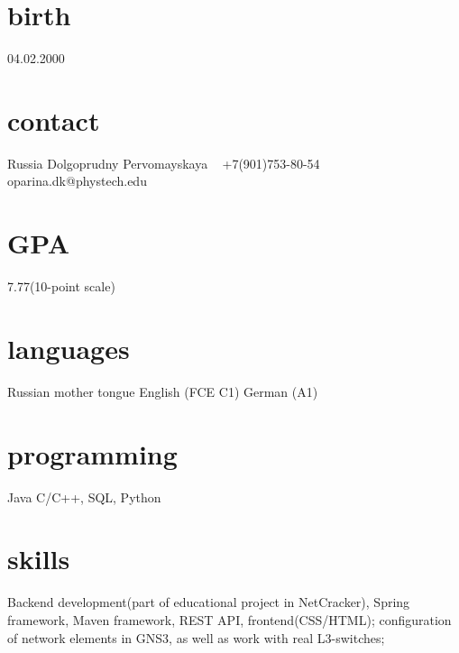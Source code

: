 \documentclass[]{cv-style}          %
\begin{document}
\lastupdated


\begin{aside}
%
\section{birth}
04.02.2000
\section{contact}
Russia
Dolgoprudny
Pervomayskaya
~
+7(901)753-80-54
~
oparina.dk@phystech.edu
%
\section{GPA}
7.77(10-point scale)
\section{languages}
Russian mother tongue
English (FCE C1)
German (A1)
%
\section{programming}
Java
C/C++, SQL, Python

%
\end{aside}


\section{skills}
  \vspace{-0.2cm}

Backend development(part of educational project in NetCracker), Spring framework, Maven framework, REST API, frontend(CSS/HTML); configuration of network elements in GNS3, as well as work with real L3-switches; 


\end{document}
